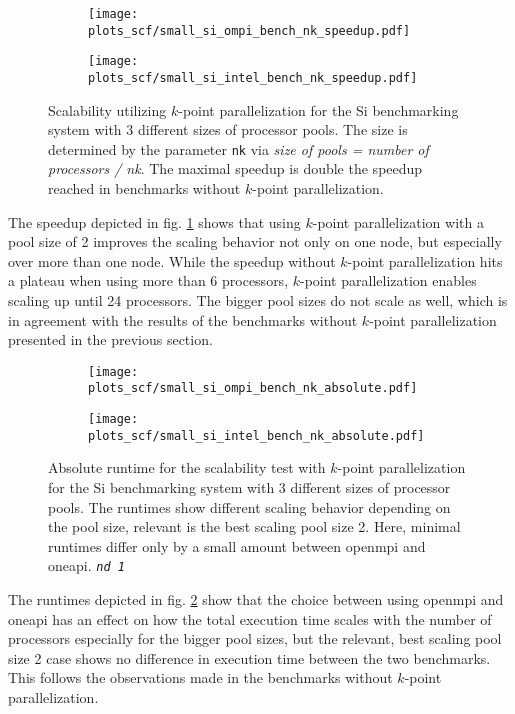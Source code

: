 \documentclass[main.tex]{subfiles}
\begin{document}
\begin{figure}
\begin{subfigure}[b]{0.49\textwidth}
    \centering
    \texttt{[image: plots\_scf/small\_si\_ompi\_bench\_nk\_speedup.pdf]}
\end{subfigure}
\begin{subfigure}[b]{0.49\textwidth}
    \centering
    \texttt{[image: plots\_scf/small\_si\_intel\_bench\_nk\_speedup.pdf]}
\end{subfigure}
\caption{Scalability utilizing \(k\)-point parallelization for the Si benchmarking system with 3 different sizes of processor pools. The size is determined by the parameter \texttt{nk} via \emph{size of pools = number of processors / nk}. The maximal speedup is double the speedup reached in benchmarks without \(k\)-point parallelization.}
\label{fig:scaling_scf_nk_si}
\end{figure}
The speedup depicted in fig. \ref{fig:scaling_scf_nk_si} shows that using \(k\)-point parallelization with a pool size of 2 improves the scaling behavior not only on one node, but especially over more than one node.
While the speedup without \(k\)-point parallelization hits a plateau when using more than 6 processors, \(k\)-point parallelization enables scaling up until 24 processors.
The bigger pool sizes do not scale as well, which is in agreement with the results of the benchmarks without \(k\)-point parallelization presented in the previous section.

\begin{figure}
\begin{subfigure}[b]{0.49\textwidth}
    \centering
    \texttt{[image: plots\_scf/small\_si\_ompi\_bench\_nk\_absolute.pdf]}
\end{subfigure}
\begin{subfigure}[b]{0.49\textwidth}
    \centering
    \texttt{[image: plots\_scf/small\_si\_intel\_bench\_nk\_absolute.pdf]}
\end{subfigure}
\caption{Absolute runtime for the scalability test with \(k\)-point parallelization for the Si benchmarking system with 3 different sizes of processor pools. The runtimes show different scaling behavior depending on the pool size, relevant is the best scaling pool size 2. Here, minimal runtimes differ only by a small amount between \gls{openmpi} and \gls{oneapi}. \emph{\texttt{nd 1}}}
\label{fig:scaling_scf_nk_si_absolute}
\end{figure}
The runtimes depicted in fig. \ref{fig:scaling_scf_nk_si_absolute} show that the choice between using \gls{openmpi} and \gls{oneapi} has an effect on how the total execution time scales with the number of processors especially for the bigger pool sizes, but the relevant, best scaling pool size 2 case shows no difference in execution time between the two benchmarks.
This follows the observations made in the benchmarks without \(k\)-point parallelization.
\end{document}
